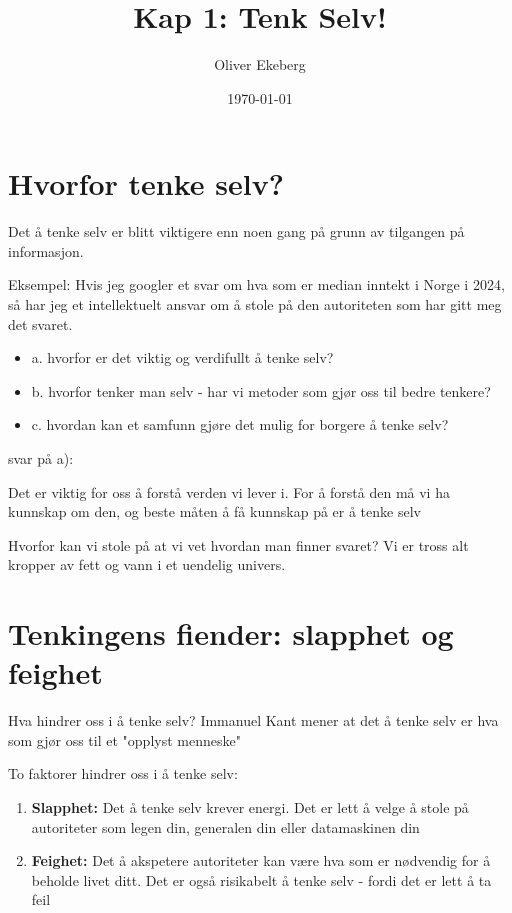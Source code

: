 \documentclass[11pt]{article}
\title{Kap 1: Tenk Selv!}
\author{Oliver Ekeberg}
\date{\today}
\begin{document}
\maketitle

\section{Hvorfor tenke selv?}

Det å tenke selv er blitt viktigere enn noen gang på grunn av tilgangen på informasjon.

\vspace{1em}
Eksempel: Hvis jeg googler et svar om hva som er median inntekt i Norge i 2024, så har jeg et intellektuelt ansvar om å stole på den autoriteten som har gitt meg det svaret. 

\vspace{1em}
\begin{itemize}
    \item a. hvorfor er det viktig og verdifullt å tenke selv?
    \item b. hvorfor tenker man selv - har vi metoder som gjør oss til bedre tenkere?
    \item c. hvordan kan et samfunn gjøre det mulig for borgere å tenke selv?
\end{itemize}


\vspace{1em}
svar på a):

Det er viktig for oss å forstå verden vi lever i. For å forstå den må vi ha kunnskap om den, og beste måten å få kunnskap på er å tenke selv

\vspace{1em}
Hvorfor kan vi stole på at vi vet hvordan man finner svaret? Vi er tross alt kropper av fett og vann i et uendelig univers. 



\section{Tenkingens fiender: slapphet og feighet}

Hva hindrer oss i å tenke selv? Immanuel Kant mener at det å tenke selv er hva som gjør oss til et "opplyst menneske"

To faktorer hindrer oss i å tenke selv:
\begin{enumerate}
    \item \textbf{Slapphet:} Det å tenke selv krever energi. Det er lett å velge å stole på autoriteter som legen din, generalen din eller datamaskinen din
    \item \textbf{Feighet:} Det å akspetere autoriteter kan være hva som er nødvendig for å beholde livet ditt. Det er også risikabelt å tenke selv - fordi det er lett å ta feil
\end{enumerate}
\end{document}
